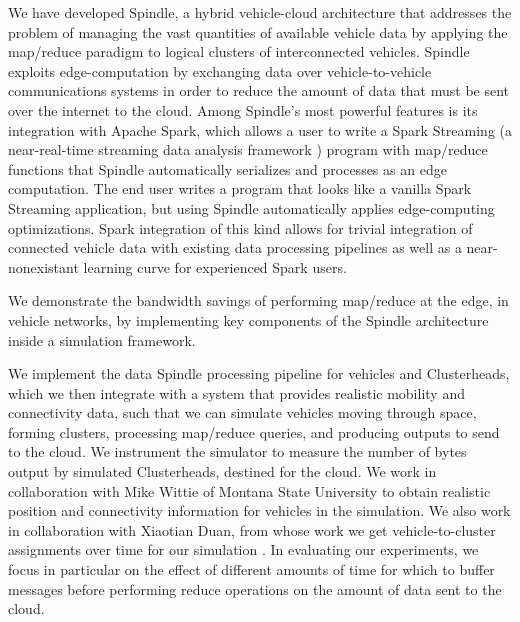 \documentclass{thesis}
\begin{document}
    We have developed Spindle, a hybrid vehicle-cloud architecture that addresses the problem of 
    managing the vast quantities of available vehicle data by applying the map/reduce \cite{mapreduce}
    paradigm to logical clusters of interconnected vehicles. Spindle exploits edge-computation
    by exchanging data over vehicle-to-vehicle communications systems in order to reduce the amount of data
    that must be sent over the internet to the cloud. Among Spindle's most powerful features is its
    integration with Apache Spark, which allows a user to write a Spark Streaming (a near-real-time streaming
    data analysis framework \cite{spark:streaming}) program with map/reduce functions that Spindle 
    automatically serializes and processes as an edge computation.
    The end user writes a program that looks like a vanilla Spark Streaming application, but using
    Spindle automatically applies edge-computing optimizations. Spark integration of this kind 
    allows for trivial integration of connected vehicle data with existing data processing pipelines
    as well as a near-nonexistant learning curve for experienced Spark users.

    We demonstrate the bandwidth savings of performing map/reduce at the edge, in
    vehicle networks, by implementing key components of the Spindle architecture inside a simulation framework.

    We implement the data Spindle processing pipeline for vehicles and Clusterheads, which we then integrate
    with a system that provides realistic mobility and connectivity data, such that we can simulate vehicles
    moving through space, forming clusters, processing map/reduce queries, and producing outputs to send to
    the cloud. We instrument the simulator to measure the number of bytes output by simulated Clusterheads,
    destined for the cloud. We work in collaboration with Mike Wittie of Montana State University to obtain
    realistic position and connectivity information for vehicles in the simulation. We also work in
    collaboration with Xiaotian Duan, from whose work we get vehicle-to-cluster assignments over time
    for our simulation \cite{xiaotian}. In evaluating our experiments, we focus in particular on the effect of different
    amounts of time for which to buffer messages before performing reduce operations
    on the amount of data sent to the cloud. 
    
\end{document}
